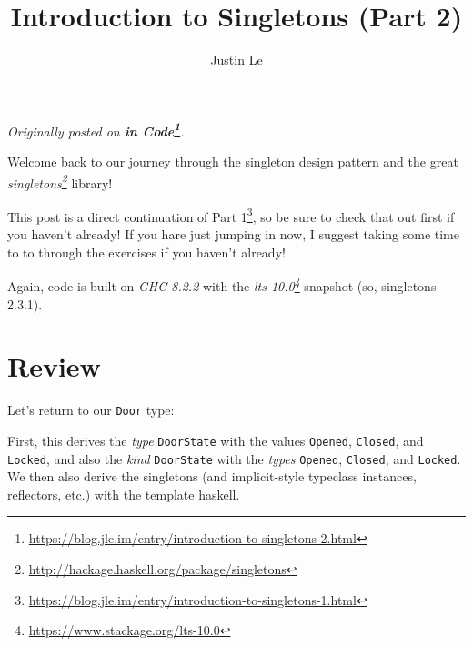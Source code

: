 \documentclass[]{article}
\title{Introduction to Singletons (Part 2)}
\author{Justin Le}
\newenvironment{Shaded}{}{}
\newcommand{\KeywordTok}[1]{\textcolor[rgb]{0.00,0.44,0.13}{\textbf{#1}}}
\newcommand{\DataTypeTok}[1]{\textcolor[rgb]{0.56,0.13,0.00}{#1}}
\newcommand{\CommentTok}[1]{\textcolor[rgb]{0.38,0.63,0.69}{\textit{#1}}}
\newcommand{\OtherTok}[1]{\textcolor[rgb]{0.00,0.44,0.13}{#1}}
\newcommand{\FunctionTok}[1]{\textcolor[rgb]{0.02,0.16,0.49}{#1}}
\newcommand{\NormalTok}[1]{#1}
\renewcommand{\href}[2]{#2\footnote{\url{#1}}}
\begin{document}
\maketitle

\emph{Originally posted on
\textbf{\href{https://blog.jle.im/entry/introduction-to-singletons-2.html}{in
Code}}.}

Welcome back to our journey through the singleton design pattern and the great
\emph{\href{http://hackage.haskell.org/package/singletons}{singletons}} library!

This post is a direct continuation of
\href{https://blog.jle.im/entry/introduction-to-singletons-1.html}{Part 1}, so
be sure to check that out first if you haven't already! If you hare just jumping
in now, I suggest taking some time to to through the exercises if you haven't
already!

Again, code is built on \emph{GHC 8.2.2} with the
\emph{\href{https://www.stackage.org/lts-10.0}{lts-10.0}} snapshot (so,
singletons-2.3.1).

\section{Review}\label{review}

Let's return to our \texttt{Door} type:

\begin{Shaded}
\end{Shaded}

First, this derives the \emph{type} \texttt{DoorState} with the values
\texttt{Opened}, \texttt{Closed}, and \texttt{Locked}, and also the \emph{kind}
\texttt{DoorState} with the \emph{types} \texttt{\textquotesingle{}Opened},
\texttt{\textquotesingle{}Closed}, and \texttt{\textquotesingle{}Locked}. We
then also derive the singletons (and implicit-style typeclass instances,
reflectors, etc.) with the template haskell.
\end{document}
